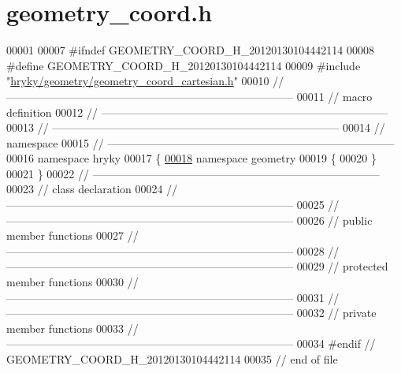 \hypertarget{geometry__coord_8h_source}{\section{geometry\-\_\-coord.\-h}
}

\begin{DoxyCode}
00001 
00007 \textcolor{preprocessor}{#ifndef GEOMETRY\_COORD\_H\_20120130104442114}
00008 \textcolor{preprocessor}{}\textcolor{preprocessor}{#define GEOMETRY\_COORD\_H\_20120130104442114}
00009 \textcolor{preprocessor}{}\textcolor{preprocessor}{#include "\hyperlink{geometry__coord__cartesian_8h}{hryky/geometry/geometry_coord_cartesian.h}"}
00010 \textcolor{comment}{//
      ------------------------------------------------------------------------------}
00011 \textcolor{comment}{// macro definition}
00012 \textcolor{comment}{//
      ------------------------------------------------------------------------------}
00013 \textcolor{comment}{//
      ------------------------------------------------------------------------------}
00014 \textcolor{comment}{// namespace}
00015 \textcolor{comment}{//
      ------------------------------------------------------------------------------}
00016 \textcolor{keyword}{namespace }hryky
00017 \{
\hypertarget{geometry__coord_8h_source_l00018}{}\hyperlink{namespacehryky_1_1geometry}{00018} \textcolor{keyword}{namespace }geometry
00019 \{
00020 \}
00021 \}
00022 \textcolor{comment}{//
      ------------------------------------------------------------------------------}
00023 \textcolor{comment}{// class declaration}
00024 \textcolor{comment}{//
      ------------------------------------------------------------------------------}
00025 \textcolor{comment}{//
      ------------------------------------------------------------------------------}
00026 \textcolor{comment}{// public member functions}
00027 \textcolor{comment}{//
      ------------------------------------------------------------------------------}
00028 \textcolor{comment}{//
      ------------------------------------------------------------------------------}
00029 \textcolor{comment}{// protected member functions}
00030 \textcolor{comment}{//
      ------------------------------------------------------------------------------}
00031 \textcolor{comment}{//
      ------------------------------------------------------------------------------}
00032 \textcolor{comment}{// private member functions}
00033 \textcolor{comment}{//
      ------------------------------------------------------------------------------}
00034 \textcolor{preprocessor}{#endif // GEOMETRY\_COORD\_H\_20120130104442114}
00035 \textcolor{preprocessor}{}\textcolor{comment}{// end of file}
\end{DoxyCode}
